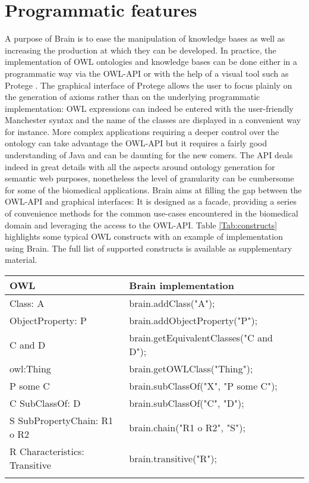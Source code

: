 \documentclass{bioinfo}
\begin{document}
\section{Programmatic features}
A purpose of Brain is to ease the manipulation of knowledge bases as well as increasing the production at which they can be developed.
In practice, the implementation of OWL ontologies and knowledge bases can be done either in a programmatic way 
via the OWL-API \citep{MatthewHorridge2011} or with the
help of a visual tool such as Protege \citep{StanfordCenterforBiomedicalInformaticsResearch}. 
The graphical interface of Protege allows the user to focus 
plainly on the generation of axioms rather than on the underlying programmatic implementation:
OWL expressions can indeed be entered 
with the user-friendly Manchester syntax and the name of the classes are displayed in a convenient way for instance. 
More complex applications requiring a deeper control over the ontology
can take advantage the OWL-API but it requires a fairly good understanding of Java and can be daunting for the new comers.
The API deals indeed in great details with all the aspects around ontology generation for semantic web purposes, nonetheless the 
level of granularity can be cumbersome for some of the biomedical applications. Brain aims at filling the gap between the OWL-API
and graphical interfaces: It is designed as a facade, providing a series of convenience methods for the common
use-cases encountered in the biomedical domain and leveraging the access to the OWL-API. 
Table \ref{Tab:constructs} highlights some typical OWL constructs 
with an example of implementation using Brain. The full list of supported constructs is available as supplementary material.
\begin{table}[!h]
{\begin{tabular}{llll}\toprule
OWL & Brain implementation\\\midrule
Class: A & brain.addClass("A");\\
ObjectProperty: P & brain.addObjectProperty("P");\\
C and D & brain.getEquivalentClasses("C and D");\\
owl:Thing & brain.getOWLClass("Thing");\\
P some C & brain.subClassOf("X", "P some C");\\
C SubClassOf: D & brain.subClassOf("C", "D");\\
S SubPropertyChain: R1 o R2 & brain.chain("R1 o R2", "S");\\
R Characteristics: Transitive & brain.transitive("R");\\\botrule
\end{tabular}}{}
\end{table}
\end{document}
